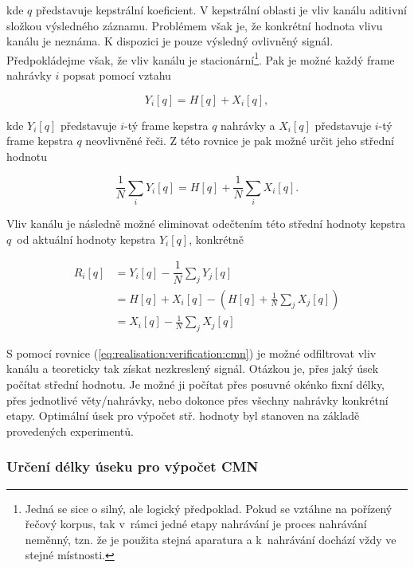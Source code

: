 \noindent kde $q$ představuje kepstrální koeficient.
V kepstrální oblasti je vliv kanálu aditivní složkou výsledného záznamu.
Problémem však je, že konkrétní hodnota vlivu kanálu je neznáma.
K dispozici je pouze výsledný ovlivněný signál.
Předpokládejme však, že vliv kanálu je stacionární\footnote{Jedná se sice o silný, ale logický předpoklad. Pokud se vztáhne na pořízený řečový korpus, tak v~rámci jedné etapy nahrávání je proces nahrávání neměnný, tzn. že je použita stejná aparatura a  k~nahrávání dochází vždy ve stejné místnosti.}.
Pak je možné každý frame nahrávky $i$ popsat pomocí vztahu

\begin{equation}
  Y_i\left[q\right] = H\left[q\right] + X_i\left[q\right],
\end{equation}

\noindent kde $Y_i\left[q\right]$ představuje $i$-tý frame kepstra $q$ nahrávky a $X_i\left[q\right]$ představuje $i$-tý frame kepstra $q$ neovlivněné řeči.
Z této rovnice je pak možné určit jeho střední hodnotu

\begin{equation}
  \frac{1}{N} \sum_i Y_i\left[q\right] = H\left[q\right] + \frac{1}{N} \sum_i X_i\left[q\right].
\end{equation}

\noindent Vliv kanálu je následně možné eliminovat odečtením této střední hodnoty kepstra $q$~od aktuální hodnoty kepstra $Y_i\left[q\right]$, konkrétně

\begin{align}
  R_i\left[q\right] &= Y_i\left[q\right] - \dfrac{1}{N}\sum_{j} Y_j\left[q\right] \nonumber  \\
  &= H\left[q\right] + X_i\left[q\right] - \left( H\left[q\right] + \frac{1}{N} \sum_j X_j\left[q\right] \right) \nonumber  \\
  &= X_i\left[q\right] - \frac{1}{N} \sum_j X_j\left[q\right]
  \label{eq:realisation:verification:cmn}
\end{align}

\noindent S pomocí rovnice (\ref{eq:realisation:verification:cmn}) je možné odfiltrovat vliv kanálu a teoreticky tak získat nezkreslený signál.
Otázkou je, přes jaký úsek počítat střední hodnotu.
Je možné ji počítat přes posuvné okénko fixní délky, přes jednotlivé věty/nahrávky, nebo dokonce přes všechny nahrávky konkrétní etapy.
Optimální úsek pro výpočet stř. hodnoty byl stanoven na základě provedených experimentů.

\subsubsection{Určení délky úseku pro výpočet CMN}

